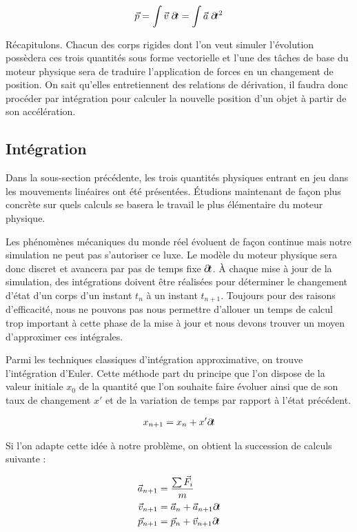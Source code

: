 \begin{align*}
  \vec{p} = \int \vec{v}\; \partial \! t = \int \vec{a}\; \partial \! t^2
\end{align*}

Récapitulons. Chacun des corps rigides dont l'on veut simuler
l'évolution possèdera ces trois quantités sous forme vectorielle et
l'une des tâches de base du moteur physique sera de traduire
l'application de forces en un changement de position. On sait qu'elles
entretiennent des relations de dérivation, il faudra donc procéder par
intégration pour calculer la nouvelle position d'un objet à partir de
son accélération.

\subsection{Intégration}

Dans la sous-section précédente, les trois quantités physiques entrant
en jeu dans les mouvements linéaires ont été présentées. \'Etudions
maintenant de façon plus concrète sur quels calculs se basera le
travail le plus élémentaire du moteur physique.

Les phénomènes mécaniques du monde réel évoluent de façon continue
mais notre simulation ne peut pas s'autoriser ce luxe. Le modèle du
moteur physique sera donc discret et avancera par pas de temps fixe
$\partial \! t$. \`A chaque mise à jour de la simulation, des intégrations
doivent être réalisées pour déterminer le changement d'état d'un corps
d'un instant $t_n$ à un instant $t_{n+1}$. Toujours pour des raisons
d'efficacité, nous ne pouvons pas nous permettre d'allouer un temps de
calcul trop important à cette phase de la mise à jour et nous devons
trouver un moyen d'approximer ces intégrales.

Parmi les techniques classiques d'intégration approximative, on trouve
l'intégration d'Euler. Cette méthode part du principe que l'on dispose
de la valeur initiale $x_0$ de la quantité que l'on souhaite faire
évoluer ainsi que de son taux de changement $x'$ et de la variation de
temps par rapport à l'état précédent.

\begin{align*}
  x_{n+1} = x_{n} + x' \partial \! t
\end{align*}

Si l'on adapte cette idée à notre problème, on obtient la succession
de calculs suivante :

\begin{align*}
  \vec{a}_{n+1} &= \frac{\sum \vec{F}_i}{m} \\ \vec{v}_{n+1} &=
  \vec{a}_n + \vec{a}_{n+1} \partial \! t \\ \vec{p}_{n+1} &= \vec{p}_n +
  \vec{v}_{n+1} \partial \! t
\end{align*}

